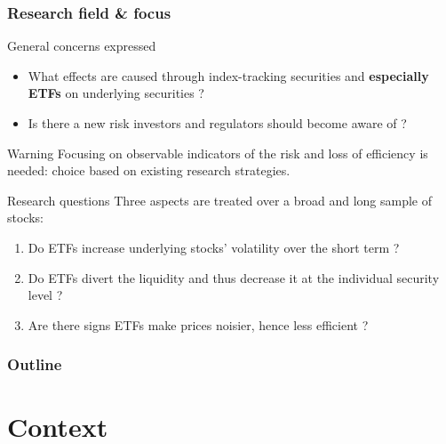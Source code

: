 \documentclass[9pt, usenames, dvipsnames]{beamer}
\begin{document}
\begin{frame}
  \frametitle{Research field \& focus}
  \begin{block}{General concerns expressed}
    \begin{itemize}
    \item What effects are caused through index-tracking securities and \textbf{especially ETFs} on underlying securities ?
    \item Is there a new risk investors and regulators should become aware of ?
    \end{itemize}
  \end{block}
  \begin{alertblock}{Warning}
    Focusing on observable indicators of the risk and loss of efficiency is needed: choice based on existing research strategies.
  \end{alertblock}
  \begin{exampleblock}{Research questions}
    Three aspects are treated over a broad and long sample of stocks:
    \begin{enumerate}
    \item<1-> Do ETFs increase underlying stocks' volatility over the short term ?
    \item<2-> Do ETFs divert the liquidity and thus decrease it at the individual security level ?
    \item<3-> Are there signs ETFs make prices noisier, hence less efficient ? 
    \end{enumerate}
  \end{exampleblock}
\end{frame}


\begin{frame}
  \frametitle{Outline}
  \tableofcontents
\end{frame}

\section{Context}
\end{document}
